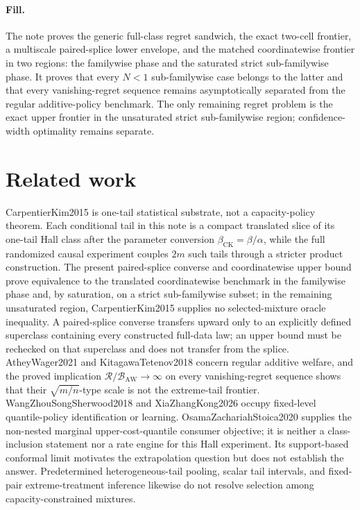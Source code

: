 \documentclass{article}
\begin{document}
\paragraph{Fill.} The note proves the generic full-class regret sandwich, the exact two-cell frontier, a multiscale paired-splice lower envelope, and the matched coordinatewise frontier in two regions: the familywise phase and the saturated strict sub-familywise phase. It proves that every \(N<1\) sub-familywise case belongs to the latter and that every vanishing-regret sequence remains asymptotically separated from the regular additive-policy benchmark. The only remaining regret problem is the exact upper frontier in the unsaturated strict sub-familywise region; confidence-width optimality remains separate.

\section{Related work}

CarpentierKim2015 is one-tail statistical substrate, not a capacity-policy theorem. Each conditional tail in this note is a compact translated slice of its one-tail Hall class after the parameter conversion \(\beta_{\mathrm{CK}}=\beta/\alpha\), while the full randomized causal experiment couples \(2m\) such tails through a stricter product construction. The present paired-splice converse and coordinatewise upper bound prove equivalence to the translated coordinatewise benchmark in the familywise phase and, by saturation, on a strict sub-familywise subset; in the remaining unsaturated region, CarpentierKim2015 supplies no selected-mixture oracle inequality. A paired-splice converse transfers upward only to an explicitly defined superclass containing every constructed full-data law; an upper bound must be rechecked on that superclass and does not transfer from the splice. AtheyWager2021 and KitagawaTetenov2018 concern regular additive welfare, and the proved implication \(\mathcal R/\mathcal B_{\mathrm{AW}}\to\infty\) on every vanishing-regret sequence shows that their \(\sqrt{m/n}\)-type scale is not the extreme-tail frontier. WangZhouSongSherwood2018 and XiaZhangKong2026 occupy fixed-level quantile-policy identification or learning. OsamaZachariahStoica2020 supplies the non-nested marginal upper-cost-quantile consumer objective; it is neither a class-inclusion statement nor a rate engine for this Hall experiment. Its support-based conformal limit motivates the extrapolation question but does not establish the answer. Predetermined heterogeneous-tail pooling, scalar tail intervals, and fixed-pair extreme-treatment inference likewise do not resolve selection among capacity-constrained mixtures.
\end{document}
